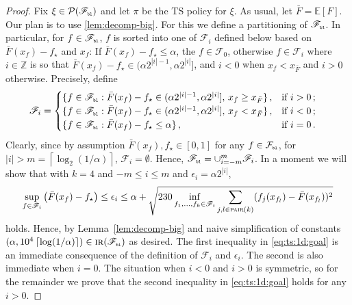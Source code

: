 \documentclass[letter, 12pt]{report}
\newcommand{\pb}{\text{\tiny\texttt{b}}}
\newcommand{\pl}{\text{\tiny\texttt{l}}}
\newcommand{\ceil}[1]{\left\lceil #1 \right\rceil}
\newcommand{\pair}{\operatorname{\textsc{pair}}}
\newcommand{\E}{\mathbb E}
\newcommand{\cF}{\mathcal F}
\newcommand{\sF}{\mathscr F}
\newcommand{\cP}{\mathcal P}
\newcommand{\1}{\mathbf{1}}
\newcommand{\IR}{\operatorname{\textsc{ir}}}
\newcommand{\ts}{\textsc{TS}\xspace}
\theoremstyle{plain}
\theoremstyle{definition}
\theoremstyle{remark}
\begin{document}
\begin{proof}
    Fix $\xi \in \cP(\sF_{\pb\pl})$ and let $\pi$ be the \ts{} policy for $\xi$.
    As usual, let $\bar{F} = \E[F]$.
    Our plan is to use \cref{lem:decomp-big}.
    For this we define a partitioning of $\sF_{\pb\pl}$.
    In particular, for $f \in \sF_{\pb\pl}$,
    $f$ is sorted into one of $\sF_i$ defined below based
    on $\bar{F}(x_f) - f_\star$ and $x_f$:
    If $\bar{F}(x_f) - f_\star \leq \alpha$, the $f \in \sF_0$,
    otherwise $f \in \sF_i$ where $i \in \mathbb{Z}$ is so that $\bar{F}(x_f) - f_\star \in (\alpha 2^{|i|-1}, \alpha 2^{|i|}]$, and $i <0$ when $x_f < x_{\bar F}$ and $i>0$ otherwise.
    Precisely, define
    \begin{align}
        \sF_i & = \begin{cases}
                      \{f \in \sF_{\pb\pl} : \bar F(x_f) - f_\star \in (\alpha 2^{|i|-1}, \alpha 2^{|i|}],\, x_f \geq x_{\bar F}\}\,, & \text{if } i > 0\,;  \\
                      \{f \in \sF_{\pb\pl} : \bar F(x_f) - f_\star \in (\alpha 2^{|i|-1}, \alpha 2^{|i|}],\, x_f < x_{\bar F}\}\,,    & \text{if } i < 0\,;  \\
                      \{f \in \sF_{\pb\pl} : \bar F(x_f) - f_\star \leq \alpha \}\,,                                                  & \text{if } i = 0 \,.
                  \end{cases}
    \end{align}
    Clearly, since by assumption $\bar{F}(x_f), f_\star \in [0,1]$ for any $f \in \cF_{\pb\pl}$,
    for $|i| > m = \ceil{\log_2(1/\alpha)}$, $\sF_i = \emptyset$. Hence, $\sF_{\pb\pl} = \cup_{i=-m}^m \sF_i$.
    In a moment we will show that with $k = 4$ and $-m \leq i \leq m$ and $\epsilon_i = \alpha 2^{|i|}$,
    \begin{align}
        \sup_{f \in \sF_i} \left(\bar F(x_f) - f_\star\right)
        \leq \epsilon_i \leq \alpha
        + \sqrt{230\inf_{f_1,\ldots,f_k \in \sF_i} \sum_{j,l \in \pair(k)} (f_j(x_{f_l}) - \bar F(x_{f_l}))^2}
        \label{eq:ts:1d:goal}
    \end{align}
    holds.
    Hence, by Lemma~\ref{lem:decomp-big} and naive simplification of constants $(\alpha, 10^4 \ceil{\log(1/\alpha)}) \in \IR(\sF_{\pb\pl})$ as desired.
    The first inequality in \cref{eq:ts:1d:goal} is an immediate consequence of the definition of $\sF_i$ and $\epsilon_i$.
    The second is also immediate when $i = 0$.
    The situation when $i < 0$ and $i > 0$ is symmetric, so for the remainder we prove that the second inequality in \cref{eq:ts:1d:goal} holds for any $i > 0$.

\end{proof}
\end{document}
